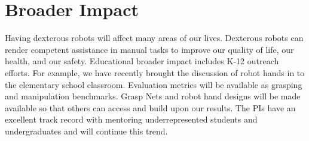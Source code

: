 
\section{Broader Impact}


Having dexterous robots will affect many areas of our lives.   Dexterous robots can render competent assistance in manual tasks to improve our quality of life, our health, and our safety.     Educational broader impact includes K-12 outreach efforts.  For example, we have recently brought the discussion of robot hands in to the elementary school classroom.    Evaluation metrics will be available as grasping and manipulation benchmarks.   Grasp Nets and robot hand designs will be made available so that others can access and build upon our results.   The PIs have an excellent track record with mentoring underrepresented students and undergraduates and will continue this trend.